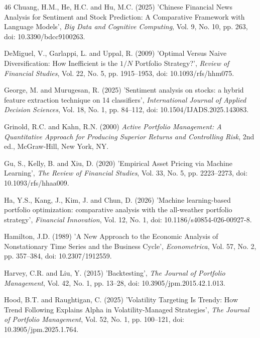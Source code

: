 \begin{thebibliography}{46}
Chuang, H.M., He, H.C. and Hu, M.C. (2025) 'Chinese Financial News Analysis for Sentiment and Stock Prediction: A Comparative Framework with Language Models', {\it Big Data and Cognitive Computing}, Vol. 9, No. 10, pp. 263, doi: 10.3390/bdcc9100263.

DeMiguel, V., Garlappi, L. and Uppal, R. (2009) 'Optimal Versus Naive Diversification: How Inefficient is the $1/N$ Portfolio Strategy?', {\it Review of Financial Studies}, Vol. 22, No. 5, pp. 1915--1953, doi: 10.1093/rfs/hhm075.

George, M. and Murugesan, R. (2025) 'Sentiment analysis on stocks: a hybrid feature extraction technique on 14 classifiers', {\it International Journal of Applied Decision Sciences}, Vol. 18, No. 1, pp. 84--112, doi: 10.1504/IJADS.2025.143083.

Grinold, R.C. and Kahn, R.N. (2000) {\it Active Portfolio Management: A Quantitative Approach for Producing Superior Returns and Controlling Risk}, 2nd ed., McGraw-Hill, New York, NY.

Gu, S., Kelly, B. and Xiu, D. (2020) 'Empirical Asset Pricing via Machine Learning', {\it The Review of Financial Studies}, Vol. 33, No. 5, pp. 2223--2273, doi: 10.1093/rfs/hhaa009.

Ha, Y.S., Kang, J., Kim, J. and Chun, D. (2026) 'Machine learning-based portfolio optimization: comparative analysis with the all-weather portfolio strategy', {\it Financial Innovation}, Vol. 12, No. 1, doi: 10.1186/s40854-026-00927-8.

Hamilton, J.D. (1989) 'A New Approach to the Economic Analysis of Nonstationary Time Series and the Business Cycle', {\it Econometrica}, Vol. 57, No. 2, pp. 357--384, doi: 10.2307/1912559.

Harvey, C.R. and Liu, Y. (2015) 'Backtesting', {\it The Journal of Portfolio Management}, Vol. 42, No. 1, pp. 13--28, doi: 10.3905/jpm.2015.42.1.013.

Hood, B.T. and Raughtigan, C. (2025) 'Volatility Targeting Is Trendy: How Trend Following Explains Alpha in Volatility-Managed Strategies', {\it The Journal of Portfolio Management}, Vol. 52, No. 1, pp. 100--121, doi: 10.3905/jpm.2025.1.764.


\end{thebibliography}
